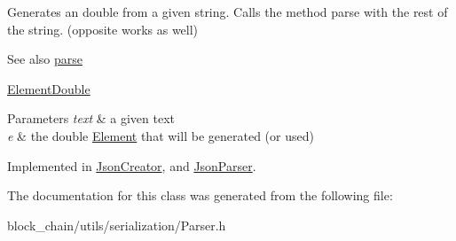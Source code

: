 Generates an double from a given string. Calls the method parse with the rest of the string. (opposite works as well) \begin{DoxySeeAlso}{See also}
\mbox{\hyperlink{classContentReader_a7fff2e63a2e8fa216665604f69974e1d}{parse}} 

\mbox{\hyperlink{classElementDouble}{Element\+Double}}
\end{DoxySeeAlso}

\begin{DoxyParams}{Parameters}
{\em text} & a given text \\
\hline
{\em e} & the double \mbox{\hyperlink{classElement}{Element}} that will be generated (or used) \\
\hline
\end{DoxyParams}


Implemented in \mbox{\hyperlink{classJsonCreator_a5e841806165fd5cb595d9f7d7c924080}{Json\+Creator}}, and \mbox{\hyperlink{classJsonParser_a07a4f2b10547d5f2251bc1f7b09d02c1}{Json\+Parser}}.



The documentation for this class was generated from the following file\+:\begin{DoxyCompactItemize}
\item 
block\+\_\+chain/utils/serialization/Parser.\+h\end{DoxyCompactItemize}

